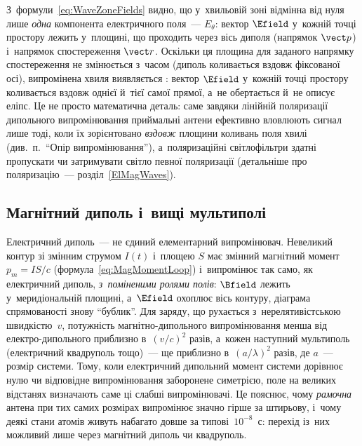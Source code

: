 З~формули~\eqref{eq:WaveZoneFields} видно, що у~хвильовій зоні відмінна від нуля лише
\emph{одна} компонента електричного поля~--- $E_\theta$: вектор $\Efield$ у~кожній точці
простору лежить у~площині, що проходить через вісь диполя (напрямок $\vect p$) і~напрямок
спостереження $\vect r$. Оскільки ця площина для заданого напрямку спостереження не
змінюється з~часом (диполь коливається вздовж фіксованої осі), випромінена хвиля
виявляється : вектор $\Efield$ у~кожній точці простору
коливається вздовж однієї й~тієї самої прямої, а~не обертається й~не описує еліпс. Це не
просто математична деталь: саме завдяки лінійній поляризації дипольного випромінювання
приймальні антени ефективно вловлюють сигнал лише тоді, коли їх зорієнтовано
\emph{вздовж} площини коливань поля хвилі (див.~п.~\enquote{Опір випромінювання}), а~поляризаційні
світлофільтри здатні пропускати чи затримувати світло певної поляризації (детальніше про
поляризацію~--- розділ~\ref{ElMagWaves}).


\subsection*{Магнітний диполь і~вищі мультиполі}

Електричний диполь~--- не єдиний елементарний випромінювач. Невеликий контур зі змінним
струмом $I(t)$ і~площею $S$ має змінний магнітний момент $p_m=IS/c$ (формула~\eqref{eq:MagMomentLoop}) і~випромінює
так само, як електричний диполь, \emph{з~поміненими ролями полів}: $\Bfield$ лежить у~меридіональній
площині, а~$\Efield$ охоплює вісь контуру, діаграма спрямованості знову \enquote{бублик}. Для заряду, що
рухається з~нерелятивістською швидкістю~$v$, потужність магнітно-дипольного випромінювання
менша від електро-дипольного приблизно в~$(v/c)^2$ разів, а~кожен наступний мультиполь
(електричний квадруполь тощо)~--- ще приблизно в~$(a/\lambda)^2$ разів, де $a$~--- розмір системи. Тому, коли
електричний дипольний момент системи дорівнює нулю чи відповідне випромінювання
заборонене симетрією, поле на великих відстанях визначають саме ці слабші
випромінювачі. Це пояснює, чому \emph{рамочна} антена при тих самих розмірах
випромінює значно гірше за штирьову, і~чому деякі стани атомів живуть набагато довше за
типові~$10^{-8}$~с: перехід із~них можливий лише через магнітний диполь чи квадруполь.



